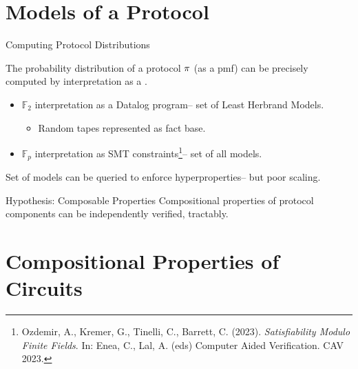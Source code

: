 \documentclass{beamer}
\begin{document}
\section{Models of a Protocol}

\begin{frame}{Computing Protocol Distributions}

  The probability distribution of a protocol $\pi$ (as a pmf) can be precisely computed
  by interpretation as a .
  \begin{itemize}
  \item $\mathbb{F}_2$ interpretation as a Datalog program-- set of Least Herbrand Models.
    \begin{itemize}
      \item Random tapes represented as fact base.
    \end{itemize}
  \item $\mathbb{F}_p$ interpretation as SMT constraints\footnote{Ozdemir, A., Kremer, G., Tinelli, C., Barrett, C. (2023). \emph{Satisfiability Modulo Finite Fields}. In: Enea, C., Lal, A. (eds) Computer Aided Verification. CAV 2023. }-- set of all models.
  \end{itemize}
  Set of models can be queried to enforce hyperproperties-- but poor scaling.

  \begin{alertblock}{Hypothesis: Composable Properties}
    Compositional properties of protocol components can be independently verified, tractably.
  \end{alertblock}
  
\end{frame}

\section{Compositional Properties of Circuits}
\end{document}
